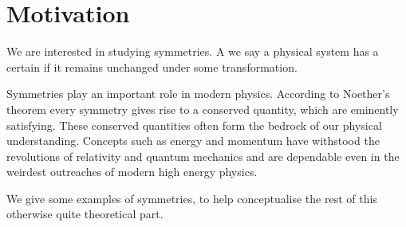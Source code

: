 \section{Motivation}
We are interested in studying symmetries. A we say a physical system has a certain  if it remains unchanged under some transformation.

Symmetries play an important role in modern physics. According to Noether's theorem every symmetry gives rise to a conserved quantity, which are eminently satisfying. These conserved quantities often form the bedrock of our physical understanding. Concepts such as energy and momentum have withstood the revolutions of relativity and quantum mechanics and are dependable even in the weirdest outreaches of modern high energy physics.

We give some examples of symmetries, to help conceptualise the rest of this otherwise quite theoretical part.
